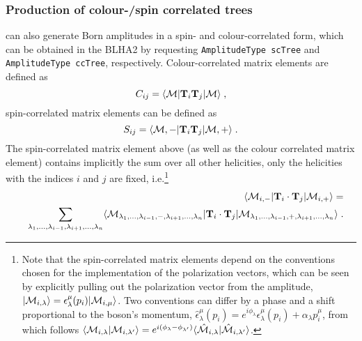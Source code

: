 

\subsubsection{Production of colour-/spin correlated trees}
\gosam{} can also generate Born amplitudes in a spin- and colour-correlated form, which can be obtained in the BLHA2 by requesting \texttt{AmplitudeType scTree} and \texttt{AmplitudeType ccTree}, respectively. Colour-correlated matrix elements are defined as
\begin{equation}
 C_{ij}=\langle{{\cal M}}|\textbf{T}_{i}\textbf{T}_j |{{\cal M}}\rangle\;,
\end{equation}
spin-correlated matrix elements can be defined as
\begin{equation}
 S_{ij}=\langle{{\cal M},-}|\textbf{T}_{i}\textbf{T}_j |{{\cal M},+}\rangle\;.
\end{equation}
The spin-correlated matrix element above (as well as the colour correlated matrix element) contains implicitly the sum over all other helicities, only the helicities with the indices $i$ and $j$ are fixed, i.e.\footnote{Note that the spin-correlated matrix elements depend on the conventions chosen for the implementation of the polarization vectors, which can be seen by explicitly pulling out the polarization vector from the amplitude, $|{\cal M}_{i,\lambda}\rangle=\epsilon_\lambda^\mu(p_i)|{\cal M}_{i,\mu}\rangle$. Two conventions can differ by a phase and a shift proportional to the boson's momentum, $\hat{\epsilon}_\lambda^{\mu}(p_i)=e^{i\phi_\lambda}\epsilon_\lambda^\mu(p_i)+\alpha_\lambda p_i^\mu$, from which follows $\langle{\cal M}_{i,\lambda}|{\cal M}_{i,\lambda'}\rangle=e^{i(\phi_{\lambda}-\phi_{\lambda'})}\langle\hat{{\cal M}}_{i,\lambda}|\hat{{\cal M}}_{i,\lambda'}\rangle$.}
 \begin{eqnarray}
&&\langle {\cal M}_{i,-} |{\mathbf T}_i\cdot {\mathbf T}_j |{\cal M}_{i,+}\rangle =\\
&&\sum_{\lambda_1,...,\lambda_{i-1},\lambda_{i+1},...,\lambda_n}
\langle {\cal M}_{\lambda_1,...,\lambda_{i-1},-,\lambda_{i+1},...,\lambda_n} |
{\mathbf T}_i\cdot {\mathbf T}_j |
{\cal M}_{\lambda_1,...,\lambda_{i-1},+,\lambda_{i+1},...,\lambda_n}\rangle \;. \nonumber
\end{eqnarray}
